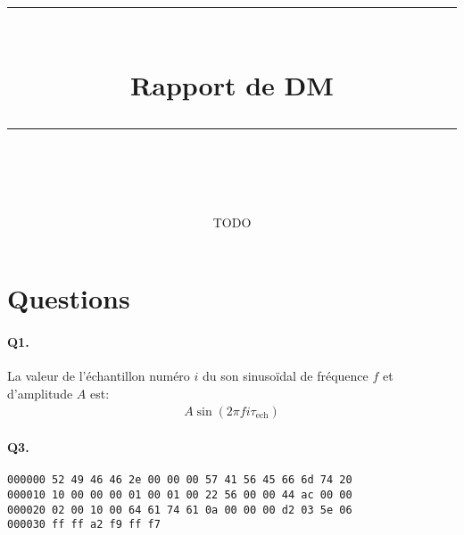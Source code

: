 \documentclass[11pt]{article} %
\title{
    \vspace{10pt} %
    \rule{\linewidth}{1pt}\\ %
    \vspace{10pt} %
    {\huge Rapport de DM}\\ %
    \rule{\linewidth}{1pt}\\ %
    \vspace{5pt} %
}
\date{\printdate{2024-12-29}}
\author{TODO}
\newcommand{\nbsp}{\nobreakspace}
\begin{document}
\maketitle{}

\section{Questions}
\paragraph{Q1.}
La valeur de l’échantillon numéro $i$ du son sinusoïdal de fréquence $f$ et
d’amplitude $A$ est\nbsp:
\begin{align*}
A \sin(2\pi f i \tau_\text{ech})
\end{align*}

\paragraph{Q3.}
\nbsp

\begin{lstlisting}
000000 52 49 46 46 2e 00 00 00 57 41 56 45 66 6d 74 20
000010 10 00 00 00 01 00 01 00 22 56 00 00 44 ac 00 00
000020 02 00 10 00 64 61 74 61 0a 00 00 00 d2 03 5e 06
000030 ff ff a2 f9 ff f7
\end{lstlisting}
\end{document}
